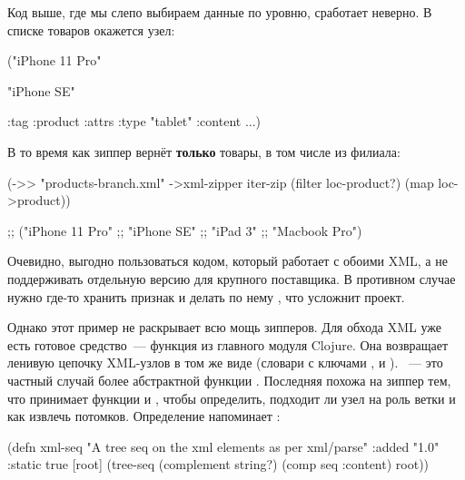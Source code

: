 Код выше, где мы слепо выбираем данные по уровню, сработает неверно. В списке
товаров окажется узел:

\begin{english}
  \begin{clojure}
("iPhone 11 Pro"

 "iPhone SE"

 {:tag :product
  :attrs {:type "tablet"}
  :content ...})
  \end{clojure}
\end{english}

В то время как зиппер вернёт \textbf{только} товары, в том числе из филиала:

\pagebreaklarge

\begin{english}
  \begin{clojure}
(->> "products-branch.xml"
     ->xml-zipper
     iter-zip
     (filter loc-product?)
     (map loc->product))

;; ("iPhone 11 Pro"
;;  "iPhone SE"
;;  "iPad 3"
;;  "Macbook Pro")
  \end{clojure}
\end{english}

Очевидно, выгодно пользоваться кодом, который работает с обоими XML, а не
поддерживать отдельную версию для крупного поставщика. В противном случае нужно
где-то хранить признак и делать по нему , что усложнит проект.


Однако этот пример не раскрывает всю мощь зипперов. Для обхода XML уже есть
готовое средство~--- функция  из главного модуля Clojure. Она
возвращает ленивую цепочку XML-узлов в том же виде (словари с ключами
,  и ). ~--- это частный
случай более абстрактной функции . Последняя похожа на зиппер
тем, что принимает функции  и , чтобы определить,
подходит ли узел на роль ветки и как извлечь потомков. Определение
 напоминает :

\begin{english}
  \begin{clojure}
(defn xml-seq
  "A tree seq on the xml elements as per xml/parse"
  {:added "1.0"
   :static true}
  [root]
  (tree-seq (complement string?)
            (comp seq :content)
            root))
  \end{clojure}
\end{english}

